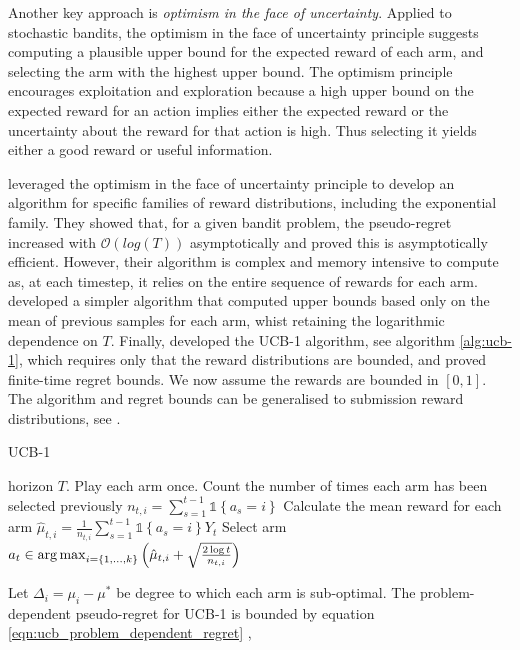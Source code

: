 \documentclass[11pt,a4paper,twoside]{report}
\newcommand{\set}[1]{\left\{#1\right\}}
\newcommand{\ind}[1]{\mathds{1}\!\!\set{#1}}
\newcommand{\argmax}{\operatornamewithlimits{arg\,max}}
\newcommand{\bigo}[1]{\mathcal{O}\left( #1 \right)}
\theoremstyle{plain}
\theoremstyle{definition}
\begin{document}
Another key approach is \emph{optimism in the face of uncertainty}. Applied to stochastic bandits, the optimism in the face of uncertainty principle suggests computing a plausible upper bound for the expected reward of each arm, and selecting the arm with the highest upper bound. The optimism principle encourages exploitation and exploration because a high upper bound on the expected reward for an action implies either the expected reward or the uncertainty about the reward for that action is high. Thus selecting it yields either a good reward or useful information. 

\citet{Lai1985} leveraged the optimism in the face of uncertainty principle to develop an algorithm for specific families of reward distributions, including the exponential family. They showed that, for a given bandit problem, the pseudo-regret increased with $\bigo{log(T)}$ asymptotically and proved this is asymptotically efficient. However, their algorithm is complex and memory intensive to compute as, at each timestep, it relies on the entire sequence of rewards for each arm. \citet{Agrawal1995} developed a simpler algorithm that computed upper bounds based only on the mean of previous samples for each arm, whist retaining the logarithmic dependence on $T$. Finally, \citet{Auer2002} developed the UCB-1 algorithm, see algorithm \ref{alg:ucb-1}, which requires only that the reward distributions are bounded, and proved finite-time regret bounds. We now assume the rewards are bounded in $[0,1]$. The algorithm and regret bounds can be generalised to submission reward distributions, see \citet{Bubeck2012}.

\begin{algorithm}[H]
\caption{UCB-1}\label{alg:ucb-1}
\begin{algorithmic}[1]
 horizon $T$.
\STATE Play each arm once. 
\STATE Count the number of times each arm has been selected previously $n_{t,i} = \sum_{s=1}^{t-1} \ind{a_s = i}$
\STATE Calculate the mean reward for each arm $\hat{\mu}_{t,i} = \frac{1}{n_{t,i}} \sum_{s=1}^{t-1}\ind{a_s = i}Y_t$
\STATE Select arm $a_t \in \argmax_{i = \set{1,...,k}}\left(\hat{\mu}_{t,i}+\sqrt{\frac{2 \log{t}}{n_{t,i}}}\right)$
\ENDFOR
\end{algorithmic}
\end{algorithm}
 
Let $\Delta_i = \mu_i - \mu^*$ be degree to which each arm is sub-optimal. The problem-dependent pseudo-regret for UCB-1 is bounded by equation \ref{eqn:ucb_problem_dependent_regret} \citep{Bubeck2012},
\end{document}
